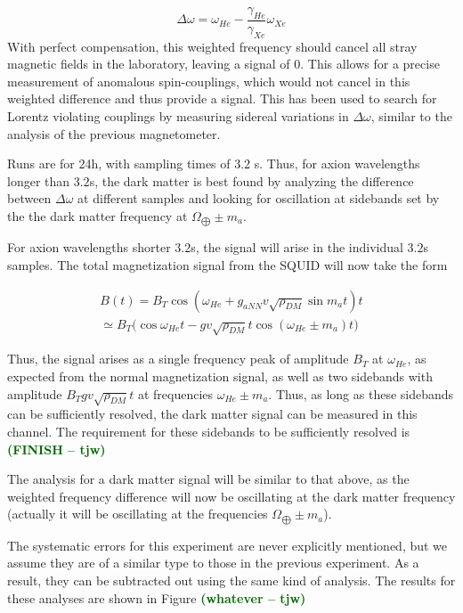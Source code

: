 \documentclass[aps,prd,final,letterpaper]{revtex4}
\newcommand{\tjw}[1]{\textbf{\textcolor{darkgreen}{(#1 -- tjw)}}}
\begin{document}
\begin{equation}
\Delta \omega = \omega_{He} - \frac{\gamma_{He}}{\gamma_{Xe}}\omega_{Xe}
\end{equation}
With perfect compensation, this weighted frequency should cancel all stray magnetic fields in the laboratory, leaving a signal of $0$. This allows for a precise measurement of anomalous spin-couplings, which would not cancel in this weighted difference and thus provide a signal. This has been used to search for Lorentz violating couplings by measuring sidereal variations in $\Delta \omega$, similar to the analysis of the previous magnetometer.  

Runs are for 24h, with sampling times of 3.2 s. Thus, for axion wavelengths longer than $3.2$s, the dark matter is best found by analyzing the difference between $\Delta \omega$ at different samples and looking for oscillation at sidebands set by the the dark matter frequency at $\Omega_{\bigoplus} \pm m_a$. 

For axion wavelengths shorter $3.2$s, the signal will arise in the individual $3.2$s samples. The total magnetization signal from the SQUID will now take the form

\begin{align}
B(t) = B_T\cos{\left(\omega_{He} + g_{aNN}v\sqrt{\rho_{DM}}\sin{m_a t}\right)t} \\
\simeq B_T\bigg(\cos{\omega_{He}t} - gv\sqrt{\rho_{DM}}t\cos{(\omega_{He} \pm m_a)t}\bigg)
\end{align}

Thus, the signal arises as a single frequency peak of amplitude $B_T$ at $\omega_{He}$, as expected from the normal magnetization signal, as well as two sidebands with amplitude $B_Tgv\sqrt{\rho_{DM}}t$ at frequencies $\omega_{He} \pm m_a$. Thus, as long as these sidebands can be sufficiently resolved, the dark matter signal can be measured in this channel. The requirement for these sidebands to be sufficiently resolved is 
\tjw{FINISH}

The analysis for a dark matter signal will be similar to that above, as the weighted frequency difference will now be oscillating at the dark matter frequency (actually it will be oscillating at the frequencies $\Omega_{\bigoplus} \pm m_a$). 

The systematic errors for this experiment are never explicitly mentioned, but we assume they are of a similar type to those in the previous experiment. As a result, they can be subtracted out using the same kind of analysis. The results for these analyses are shown in Figure \tjw{whatever}
\begingroup
\renewcommand{\section}[2]{}%
\begin{thebibliography}{100}


\end{thebibliography}
\end{document}
